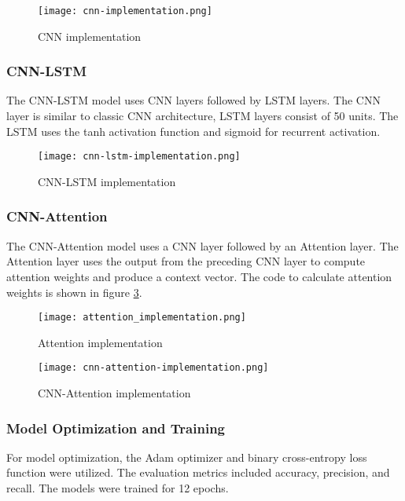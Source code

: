 \begin{figure}[ht]
    \centering
    \texttt{[image: cnn-implementation.png]}
    \caption{CNN implementation}
    \label{fig:cnn_implementation}
\end{figure}

\clearpage

\subsubsection{CNN-LSTM}
The CNN-LSTM model uses CNN layers followed by LSTM layers. The CNN layer is similar to classic CNN architecture, LSTM layers consist of 50 units. The LSTM uses the tanh activation function and sigmoid for recurrent activation.

\begin{figure}[h]
    \centering
    \texttt{[image: cnn-lstm-implementation.png]}
    \caption{CNN-LSTM implementation}
    \label{fig:cnn-lstm-implementation}
\end{figure}

\subsubsection{CNN-Attention}
The CNN-Attention model uses a CNN layer followed by an Attention layer. The Attention layer uses the output from the preceding CNN layer to compute attention weights and produce a context vector. The code to calculate attention weights is shown in figure \ref{fig:attention-implementation}.

\begin{figure}[h]
    \centering
    \texttt{[image: attention\_implementation.png]}
    \caption{Attention implementation}
    \label{fig:attention-implementation}
\end{figure}

\begin{figure}[h]
    \centering
    \texttt{[image: cnn-attention-implementation.png]}
    \caption{CNN-Attention implementation}
    \label{fig:cnn-attention-implementation}
\end{figure}

\clearpage
\subsubsection{Model Optimization and Training} 
For model optimization, the Adam optimizer and binary cross-entropy loss function were utilized. The evaluation metrics included accuracy, precision, and recall. The models were trained for 12 epochs.

